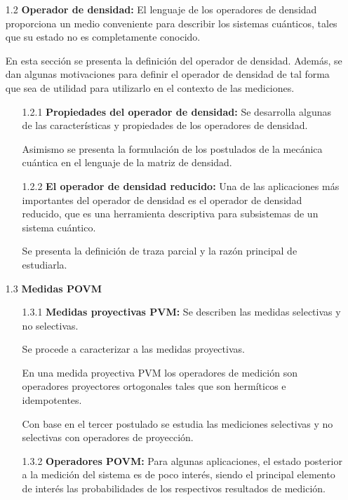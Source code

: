 \documentclass[12pt,oneside]{book}\raggedbottom{} %
\begin{document}
\begin{sloppypar}
{{\begin{itemize}



\item[1.2] \textbf{Operador de densidad:}
El lenguaje de los operadores de densidad proporciona un medio conveniente para
describir los sistemas cuánticos, tales que su estado no es completamente conocido.

En esta sección se presenta la definición del operador de densidad. Además, se dan algunas motivaciones para definir el operador de densidad de tal forma que sea de utilidad para utilizarlo en el contexto de las mediciones.
\begin{itemize}
  \item[1.2.1] \textbf{Propiedades del operador de densidad:} Se desarrolla algunas de las características y propiedades de los operadores de densidad. 
  
  Asimismo se presenta la formulación de los postulados de la mecánica cuántica en el lenguaje de la matriz de densidad.
  \item[1.2.2] \textbf{El operador de densidad reducido:} Una de las aplicaciones más importantes del operador de densidad es el operador de densidad reducido, que es una herramienta descriptiva para subsistemas de un sistema cuántico. 
  
  Se presenta la definición de traza parcial y la razón principal de estudiarla.

\end{itemize}
\item[1.3] \textbf{Medidas POVM} 
\begin{itemize}
  \item[1.3.1]\textbf{Medidas proyectivas PVM:}
  Se describen las medidas selectivas y no selectivas. 
  
  Se procede a caracterizar a las medidas proyectivas. 
  
  En una medida proyectiva PVM los operadores de medición son operadores proyectores ortogonales tales que son hermíticos e idempotentes.
  
  Con base en el tercer postulado se estudia las mediciones selectivas y no selectivas con operadores de proyección. 
  \item[1.3.2]\textbf{Operadores POVM:} Para algunas aplicaciones, el estado posterior a la medición del sistema es de poco interés, siendo el
  principal elemento de interés las probabilidades de los respectivos resultados
  de medición.
  

\end{itemize}
\end{itemize}}}
\end{sloppypar}
\end{document}
